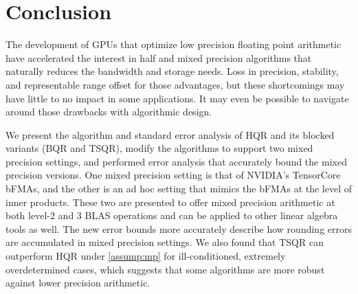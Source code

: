 \documentclass[review,onefignum,onetabnum]{siamart190516}
\begin{document}
\section{Conclusion}
The development of GPUs that optimize low precision floating point arithmetic have accelerated the interest in half and mixed precision algorithms that naturally reduces the bandwidth and storage needs. 
Loss in precision, stability, and representable range offset for those advantages, but these shortcomings may have little to no impact in some applications.
It may even be possible to navigate around those drawbacks with algorithmic design. \par 
We present the algorithm and standard error analysis of HQR and its blocked variants (BQR and TSQR), modify the algorithms to support two mixed precision settings, and performed error analysis that accurately bound the mixed precision versions.
One mixed precision setting is that of NVIDIA's TensorCore bFMAs, and the other is an ad hoc setting that mimics the bFMAs at the level of inner products.
These two are presented to offer mixed precision arithmetic at both level-2 and 3 BLAS operations and 
can be applied to other linear algebra tools as well.
The new error bounds more accurately describe how rounding errors are accumulated in mixed precision settings.
We also found that TSQR can outperform HQR under \cref{assump:mp} for ill-conditioned, extremely overdetermined cases, which suggests that some algorithms are more robust against lower precision arithmetic.
\end{document}
